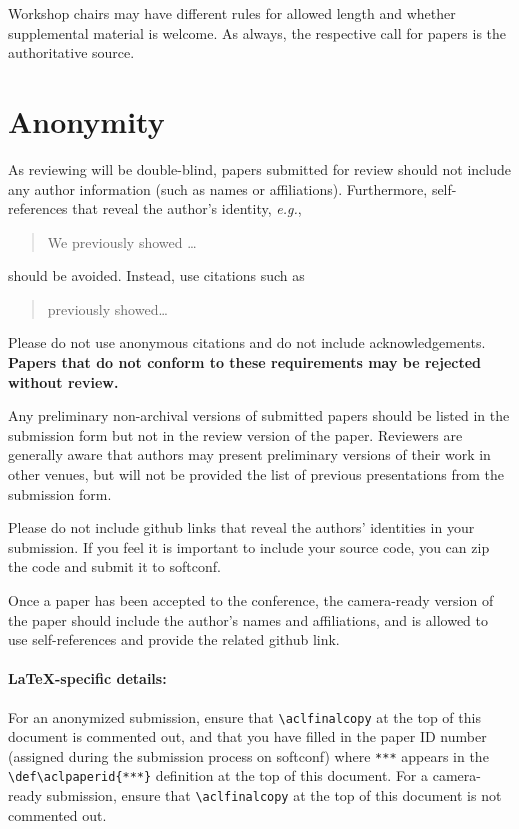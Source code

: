 \documentclass[11pt,a4paper]{article}
\begin{document}
Workshop chairs may have different rules for allowed length and whether supplemental material is welcome.
As always, the respective call for papers is the authoritative source.


\section{Anonymity}
As reviewing will be double-blind, papers submitted for review should not include any author information (such as names or affiliations). Furthermore, self-references that reveal the author's identity, \emph{e.g.},
\begin{quote}
We previously showed \citep{Gusfield:97} \ldots
\end{quote}
should be avoided. Instead, use citations such as 
\begin{quote}
\citet{Gusfield:97} previously showed\ldots
\end{quote}
Please do not use anonymous citations and do not include acknowledgements.
\textbf{Papers that do not conform to these requirements may be rejected without review.}

Any preliminary non-archival versions of submitted papers should be listed in the submission form but not in the review version of the paper.
Reviewers are generally aware that authors may present preliminary versions of their work in other venues, but will not be provided the list of previous presentations from the submission form. 

Please do not include github links that reveal the authors' identities in your submission. If you feel it is important to include your source code, you can zip the code and submit it to softconf. 

Once a paper has been accepted to the conference, the camera-ready version of the paper should include the author's names and affiliations, and is allowed to use self-references and provide the related github link.


\paragraph{\LaTeX-specific details:}
For an anonymized submission, ensure that {\small\verb|\aclfinalcopy|} at the top of this document is commented out, and that you have filled in the paper ID number (assigned during the submission process on softconf) where {\small\verb|***|} appears in the {\small\verb|\def\aclpaperid{***}|} definition at the top of this document.
For a camera-ready submission, ensure that {\small\verb|\aclfinalcopy|} at the top of this document is not commented out.
\end{document}

